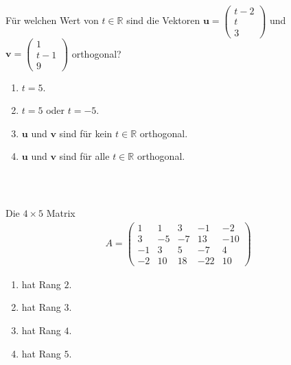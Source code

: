 \subsection*{}
Für welchen Wert von $ t \in \mathbb{R} $ sind die Vektoren $ \textbf{u} = \begin{pmatrix}
t-2 \\ t \\ 3
\end{pmatrix} $ und $ \textbf{v} = \begin{pmatrix}
1 \\ t-1 \\ 9
\end{pmatrix} $ orthogonal?
\renewcommand{\labelenumi}{(\alph{enumi})}
\begin{enumerate}
	\item 
	$t = 5$.
	\item
	$t = 5$ oder $ t = -5 $.
	\item
	$ \textbf{u} $ und $ \textbf{v}  $ sind für kein $ t \in \mathbb{R} $ orthogonal.
	\item
	$ \textbf{u} $ und $ \textbf{v}  $ sind für alle $ t \in \mathbb{R} $ orthogonal.
\end{enumerate}
\ \\
\subsection*{}
Die $4 \times 5$ Matrix
\begin{align*}
A
=
\begin{pmatrix}
1 & 1  & 3 & -1 & -2 \\
3 & -5  & -7 & 13 & -10 \\
-1 & 3  & 5 & -7 & 4 \\
-2 & 10  & 18 & -22 & 10  
\end{pmatrix}
\end{align*}
\renewcommand{\labelenumi}{(\alph{enumi})}
\begin{enumerate}
\item 
hat Rang $2$.
\item
hat Rang $3$.
\item
hat Rang $4$.
\item
hat Rang $5$.
\end{enumerate}
\ \\
